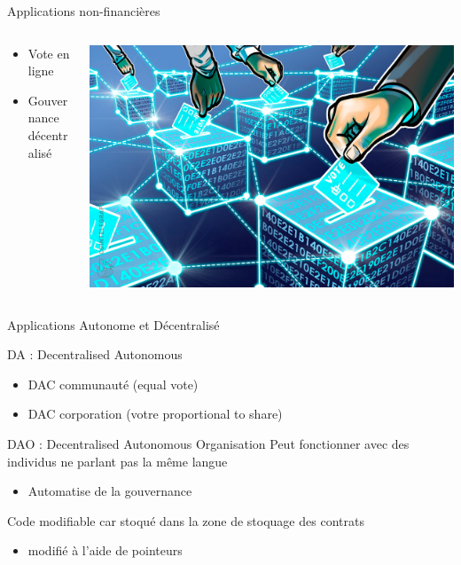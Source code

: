 \documentclass[presentation]{beamer}
\begin{document}
\begin{frame}[label={sec:org4ce75b9}]{Applications non-financières}
\begin{columns}
\begin{column}{0.35\columnwidth}
\begin{block}{}
\begin{itemize}
\item Vote en ligne
\item Gouvernance décentralisé
\end{itemize}
\end{block}
\end{column}
\begin{column}{0.5\columnwidth}
\begin{block}{}
\begin{center}
\includegraphics[width=\textwidth]{Images/block_vote.jpeg}
\end{center}     
\end{block}
\end{column}
\end{columns}
\end{frame}
\begin{frame}[label={sec:org8e1a89f}]{Applications Autonome et Décentralisé}
\begin{block}{DA : Decentralised Autonomous}
\begin{itemize}
\item DAC communauté (equal vote)
\end{itemize}
\begin{itemize}
\item DAC corporation (votre proportional to share)
\end{itemize}
\end{block}
\begin{block}{DAO : Decentralised Autonomous Organisation}
Peut fonctionner avec des individus ne parlant pas la même langue
\begin{itemize}
\item Automatise de la gouvernance
\end{itemize}
Code modifiable car stoqué dans la zone de stoquage des contrats
\begin{itemize}
\item modifié à l'aide de pointeurs
\end{itemize}
\end{block}
\end{frame}
\end{document}
